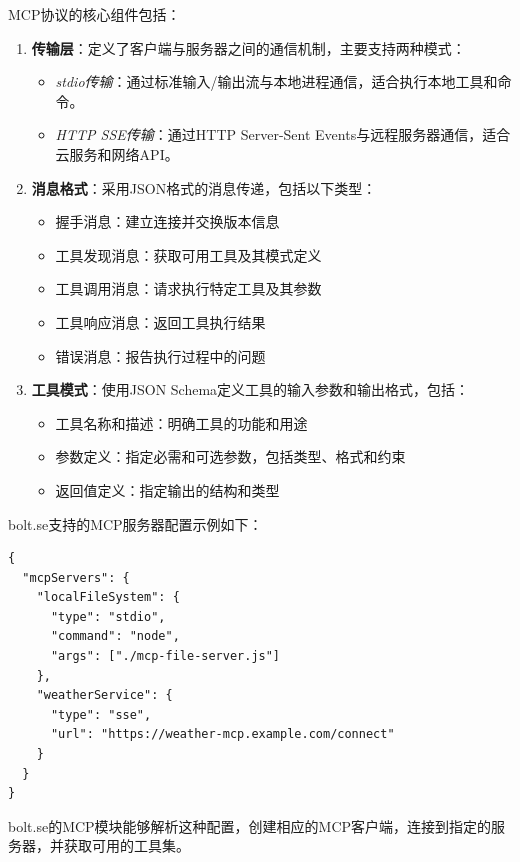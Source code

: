 MCP协议的核心组件包括：

\begin{enumerate}
  \item \textbf{传输层}：定义了客户端与服务器之间的通信机制，主要支持两种模式：
    \begin{itemize}
      \item \textit{stdio传输}：通过标准输入/输出流与本地进程通信，适合执行本地工具和命令。
      \item \textit{HTTP SSE传输}：通过HTTP Server-Sent Events与远程服务器通信，适合云服务和网络API。
    \end{itemize}
  
  \item \textbf{消息格式}：采用JSON格式的消息传递，包括以下类型：
    \begin{itemize}
      \item 握手消息：建立连接并交换版本信息
      \item 工具发现消息：获取可用工具及其模式定义
      \item 工具调用消息：请求执行特定工具及其参数
      \item 工具响应消息：返回工具执行结果
      \item 错误消息：报告执行过程中的问题
    \end{itemize}
  
  \item \textbf{工具模式}：使用JSON Schema定义工具的输入参数和输出格式，包括：
    \begin{itemize}
      \item 工具名称和描述：明确工具的功能和用途
      \item 参数定义：指定必需和可选参数，包括类型、格式和约束
      \item 返回值定义：指定输出的结构和类型
    \end{itemize}
\end{enumerate}

bolt.se支持的MCP服务器配置示例如下：

\begin{verbatim}
{
  "mcpServers": {
    "localFileSystem": {
      "type": "stdio",
      "command": "node",
      "args": ["./mcp-file-server.js"]
    },
    "weatherService": {
      "type": "sse",
      "url": "https://weather-mcp.example.com/connect"
    }
  }
}
\end{verbatim}

bolt.se的MCP模块能够解析这种配置，创建相应的MCP客户端，连接到指定的服务器，并获取可用的工具集。

